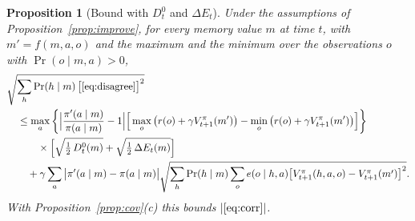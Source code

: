 \documentclass{article}
\newtheorem{proposition}{Proposition}[section]
\theoremstyle{definition}
\newcommand{\dE}{\Delta E}
\begin{document}
\begin{proposition}[Bound with $D^0_t$ and $\dE_t$]\label{prop:corrbound}
Under the assumptions of Proposition~\ref{prop:improve}, for every memory value $m$ at time $t$, with $m'=f(m,a,o)$ and the maximum and the minimum over the observations $o$ with $\Pr(o\mid m,a)>0$,
\begin{align*}
&\sqrt{\sum_h\Pr(h\mid m)\,\big[\eqref{eq:disagree}\big]^2}\\
&\quad\le\max_a\bigg\{\Big|\frac{\pi'(a\mid m)}{\pi(a\mid m)}-1\Big|\Big[\max_o\big(r(o)+\gamma V^\pi_{t+1}(m')\big)-\min_o\big(r(o)+\gamma V^\pi_{t+1}(m')\big)\Big]\bigg\}\\
&\qquad\quad\times\Big[\sqrt{\tfrac12\,D^0_t(m)}+\sqrt{\tfrac12\,\dE_t(m)}\Big]\\
&\qquad+\gamma\sum_a\big|\pi'(a\mid m)-\pi(a\mid m)\big|\sqrt{\sum_h\Pr(h\mid m)\sum_oe(o\mid h,a)\big[V^\pi_{t+1}(h,a,o)-V^\pi_{t+1}(m')\big]^2}.
\end{align*}
With Proposition~\ref{prop:cov}(c) this bounds $|\eqref{eq:corr}|$.
\end{proposition}
\end{document}
